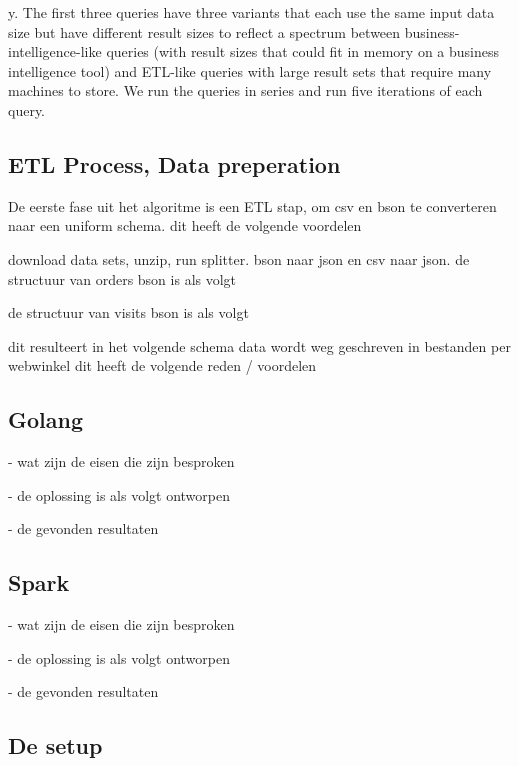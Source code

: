 y. The first three queries have three variants that each
use the same input data size but have different result sizes
to reflect a spectrum between business-intelligence-like
queries (with result sizes that could fit in memory on a
business intelligence tool) and ETL-like queries with
large result sets that require many machines to store. We
run the queries in series and run five iterations of each
query.



\subsection{ETL Process, Data preperation}


De eerste fase uit het algoritme is een ETL stap, om csv en bson te converteren naar een uniform schema. 
dit heeft de volgende voordelen


download data sets, unzip, run splitter. bson naar json en csv naar json. 
de structuur van orders bson is als volgt

de structuur van visits bson is als volgt

dit resulteert in het volgende schema
data wordt weg geschreven in bestanden per webwinkel
dit heeft de volgende reden / voordelen


\subsection{Golang}

- wat zijn de eisen die zijn besproken

- de oplossing is als volgt ontworpen

- de gevonden resultaten


\subsection{Spark}

- wat zijn de eisen die zijn besproken

- de oplossing is als volgt ontworpen

- de gevonden resultaten


\subsection{De setup}
\label{subsec:3.4hardware_specs}







